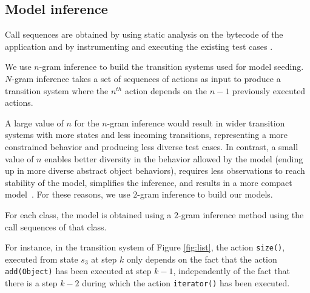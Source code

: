 \subsection{Model inference}
\label{ssec:inference}

Call sequences are obtained by using static analysis on the bytecode of the application  and by instrumenting and executing the existing test cases .

We use $n$-gram inference to build the transition systems used for model seeding. $N$-gram inference takes a set of sequences of actions as input to produce a transition system where the $n^{th}$ action depends on the $n-1$ previously executed actions.


A large value of $n$ for the $n$-gram inference would result in wider transition systems with more states and less incoming transitions, representing a more constrained behavior and producing less diverse test cases. In contrast, a small  value of $n$ enables better diversity in the behavior allowed by the model (ending up in more diverse abstract object behaviors), requires less observations to reach stability of the model, simplifies the inference, and results in a more compact model~\cite{Sprenkle2013,Sprenkle2011a}.  For these reasons, we use $2$-gram inference to build our models. %
%
%
%

%
For each class, the model  is obtained using a  $2$-gram inference method using the call sequences of that class.

%
For instance, in the transition system of Figure \ref{fig:list}, the action \texttt{size()}, executed from state $s_3$ at step $k$ only depends on the fact that the action \texttt{add(Object)} has been executed at step $k-1$, independently of the fact that there is a step $k-2$ during which the action \texttt{iterator()} has been executed.

